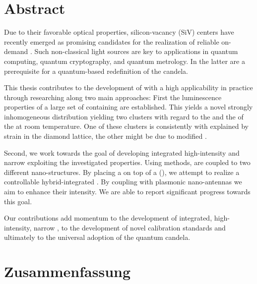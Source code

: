 
\null\vfill

\section*{Abstract}

	Due to their favorable optical properties, silicon-vacancy (SiV) centers have recently emerged as promising candidates for the realization of reliable on-demand \spss. 
	Such non-classical light sources are key to applications in quantum computing, quantum cryptography, and quantum metrology. 
	In the latter \spss are a prerequisite for a quantum-based redefinition of the candela.

	This thesis contributes to the development of \spss with a high applicability in practice through researching \sivs along two main approaches: 
	First the luminescence properties of a large set of \nds containing \sivs are established. 
	This yields a novel strongly inhomogeneous distribution yielding two clusters with regard to the \cwls and the \lw of the \zpl at room temperature.
	One of these clusters is consistently with explained by strain in the diamond lattice, the other might be due to modified \sivs.

	Second, we work towards the goal of developing integrated high-intensity and narrow \lw \spss exploiting the investigated \siv properties.
	Using \pp methods, \sivs are coupled to two different nano-structures.
	By placing a \nd on top of a \vcsel (\VCSEL), we attempt to realize a controllable hybrid-integrated \sps. 
	By coupling \sivs with plasmonic nano-antennas we aim to enhance their \pl intensity. We are able to report significant progress towards this goal.

	Our contributions add momentum to the development of integrated, high-intensity, narrow \lw \spss, to the development of novel calibration standards and ultimately to the universal adoption of the quantum candela.




\vfill

\newpage

\null\vfill

\section*{Zusammenfassung}

